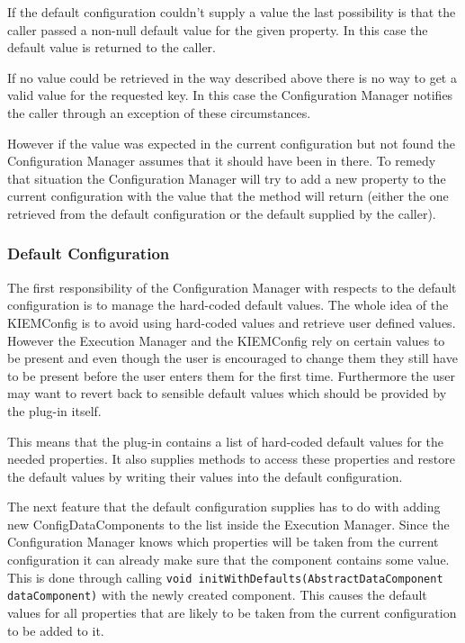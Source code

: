 If the default configuration couldn't supply a value the last possibility is that the caller passed a non-null default 
value for the given property. In this case the default value is returned to the caller. 

If no value could be retrieved in the way described above there is no way to get a valid value for the requested key. 
In this case the Configuration Manager notifies the caller through an exception of these circumstances.

However if the value was expected in the current configuration but not found the Configuration Manager assumes 
that it should have been in there. To remedy that situation the Configuration Manager will try to add a new property 
to the current configuration with the value that the method will return (either the one retrieved from the default 
configuration or the default supplied by the caller).


\subsubsection{Default Configuration}
\label{section:DefaultConfiguration}

The first responsibility of the Configuration Manager with respects to the default configuration is to manage
the hard-coded default values. The whole idea of the \ac{KIEMConfig} is to avoid using hard-coded values
and retrieve user defined values. However the Execution Manager and the \ac{KIEMConfig} rely on certain values
to be present and even though the user is encouraged to change them they still have to be present before the user
enters them for the first time. Furthermore the user may want to revert back to sensible default values which
should be provided by the plug-in itself.

This means that the plug-in contains a list of hard-coded default values for the needed properties.
It also supplies methods to access these properties and restore the default values by writing their values
into the default configuration.

\lstset{
backgroundcolor=,
}
The next feature that the default configuration supplies has to do with adding new ConfigDataComponents to the
list inside the Execution Manager. Since the Configuration Manager knows which properties will be taken from
the current configuration it can already make sure that the component contains some value. This is done
through calling \lstinline|void initWithDefaults(AbstractDataComponent dataComponent)| with the newly created component.
This causes the default values for all properties that are likely to be taken from the current configuration to
be added to it.

